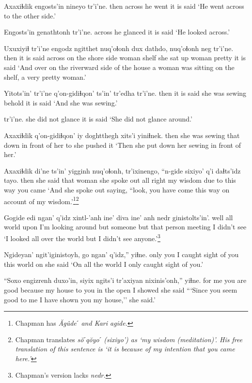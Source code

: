 \documentclass[12pt]{article}
\begin{document}
\gll Axaxiɬdik engosts'in nineyo tr'i'ne.
then  across  {he went} {it is said}
\glt `He went across to the other side.'
\glend

\gll Engosts'in genathtonh tr'i'ne.
across  {he glanced} {it is said}
\glt `He looked across.'
\glend

\gll Uxuxiyiɬ tr'i'ne engodz ngitthet  nuq'oɬonh dux  dathdo, nuq'oɬonh neg tr'i'ne.
then  {it is said} across  {on the shore side} woman shelf {she sat up} woman  pretty {it is said}
\glt `And over on the riverward side of the house a woman was sitting on the shelf, a very pretty woman.'
\glend

\gll Yitots'in' tr'i'ne {q'on-gidiɬqon' ts'in'} tr'edha tr'i'ne.
then {it is said} {she was sewing}  behold  {it is said}
\glt `And she was sewing.'
\glend

 tr'i'ne.
{she did not glance} {it is said}
\glt `She did not glance around.'
\glend

\gll Axaxiɬdik q'on-gidiɬqon' iy doghtthegh   xits'i yiniɬnek.
then  {she was sewing} that {down in front of her} to {she pushed it}
\glt `Then she put down her sewing in front of her.'
\glend

\gll Axaxiɬdik di'ne ts'in' yigginh nuq'oɬonh, tr'ixinengo, ``n-gide sixiyo' q'i  daɬts'idz tayo.
then {she said}  {} that  woman {she spoke out} {all right} {my wisdom} {due to} {this way} {you came} 
\glt `And she spoke out saying, ``look, you have come this way on account of my wisdom.'\footnote{Chapman has \em \u{A}g\^udeˊ \em and Kari \em agide.}\footnote{Chapman translates \em s\u{o}ˊq\u{o}yoˊ (sixiyo') \em as `my wisdom (meditation)'. His free translation of this sentence is `it is because of my intention that you came here.'}
\glend

\gll Gogide edi ngan' q'idz xintl-'anh ine' diva ine' anh nedr ginistolts'in'.
well  all world upon {I'm looking around} but someone but {that person} meeting {I didn't see} 
\glt `I looked all over the world but I didn't see anyone.'\footnote{Chapman's version lacks \em nedr.}
\glend

\gll Ngideyan' ngit'iginistoyh, go ngan' q'idz,'' yiɬne.
{only you} {I caught sight of you} this world on {she said}
\glt `On all the world I only caught sight of you.'
\glend

\gll ``Soxo  engizrenh duxo'in, siyix  ngits'i tr'axiyan nixinis'onh,'' yiɬne.
{for me} {you are good} because {my house} {to you} {in the open} {I showed} {she said}
\glt ```Since you seem good to me I have shown you my house,'' she said.'
\glend
\end{document}
